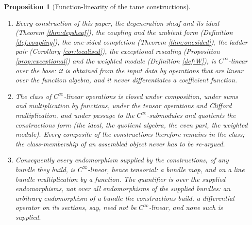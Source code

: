 \documentclass[11pt]{article}
\newtheorem{proposition}[theorem]{Proposition}
\theoremstyle{definition}
\begin{document}
\begin{proposition}[Function-linearity of the tame constructions]\label{prop:functionlinear}
\leavevmode
\begin{enumerate}
\item Every construction of this paper, the degeneration sheaf and its ideal (Theorem \ref{thm:degsheaf}), the coupling and the ambient form (Definition \ref{def:coupling}), the one-sided completion (Theorem \ref{thm:onesided}), the ladder pair (Corollary \ref{cor:localised}), the exceptional rescaling (Proposition \ref{prop:exceptional}) and the weighted module (Definition \ref{def:W}), is $C^\infty$-linear over the base: it is obtained from the input data by operations that are linear over the function algebra, and it never differentiates a coefficient function.
\item The class of $C^\infty$-linear operations is closed under composition, under sums and multiplication by functions, under the tensor operations and Clifford multiplication, and under passage to the $C^\infty$-submodules and quotients the constructions form (the ideal, the quotient algebra, the even part, the weighted module). Every composite of the constructions therefore remains in the class; the class-membership of an assembled object never has to be re-argued.
\item Consequently every endomorphism \emph{supplied by} the constructions, of any bundle they build, is $C^\infty$-linear, hence tensorial: a bundle map, and on a line bundle multiplication by a function. The quantifier is over the supplied endomorphisms, not over all endomorphisms of the supplied bundles: an arbitrary endomorphism of a bundle the constructions build, a differential operator on its sections, say, need not be $C^\infty$-linear, and none such is supplied.
\end{enumerate}
\end{proposition}
\end{document}
